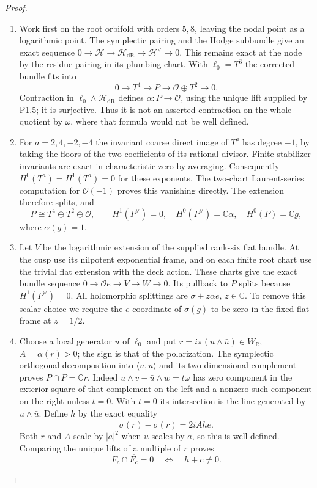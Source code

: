 \documentclass[11pt,a4paper]{article}
\theoremstyle{definition}
\begin{document}
\begin{proof}
\begin{enumerate}[label=\arabic*.]
\item Work first on the root orbifold with orders $5,8$, leaving the nodal
point as a logarithmic point.  The symplectic pairing and the Hodge
subbundle give an exact sequence
$0\to\mathcal H\to\mathcal H_{\mathrm{dR}}\to\mathcal H^\vee\to0$.
This remains exact at the node by the residue pairing in its plumbing
chart.  With $\ell_0=T^3$ the corrected bundle fits into
\[
0\longrightarrow T^4\longrightarrow P
 \longrightarrow\mathcal O\oplus T^2\longrightarrow0.
\]
Contraction in $\ell_0\wedge\mathcal H_{\mathrm{dR}}$ defines
$\alpha:P\to\mathcal O$, using the unique lift supplied by P1.5;
it is surjective.  Thus it is not an asserted contraction on the whole
quotient by $\omega$, where that formula would not be well defined.

\item For $a=2,4,-2,-4$ the invariant coarse direct image of $T^a$ has degree
$-1$, by taking the floors of the two coefficients of its rational
divisor.  Finite-stabilizer invariants are exact in characteristic zero
by averaging.  Consequently $H^0(T^a)=H^1(T^a)=0$ for these exponents.
The two-chart Laurent-series computation for $\mathcal O(-1)$ proves
this vanishing directly.  The extension therefore splits, and
\[
P\cong T^4\oplus T^2\oplus\mathcal O,\qquad
H^1(P^\vee)=0,\quad H^0(P^\vee)=\mathbb C\alpha,
\quad H^0(P)=\mathbb Cg,
\]
where $\alpha(g)=1$.

\item Let $V$ be the logarithmic extension of the supplied rank-six flat
bundle.  At the cusp use its nilpotent exponential frame, and on each
finite root chart use the trivial flat extension with the deck action.
These charts give the exact bundle sequence
$0\to\mathcal Oe\to V\to W\to0$.
Its pullback to $P$ splits because $H^1(P^\vee)=0$.
All holomorphic splittings are $\sigma+z\alpha e$, $z\in\mathbb C$.
To remove this scalar choice we require the $e$-coordinate of
$\sigma(g)$ to be zero in the fixed flat frame at $z=1/2$.

\item Choose a local generator $u$ of $\ell_0$ and put
$r=i\pi(u\wedge\bar u)\in W_{\mathbb R}$, $A=\alpha(r)>0$;
the sign is that of the polarization.  The symplectic orthogonal
decomposition into $\langle u,\bar u\rangle$ and its two-dimensional
complement proves $P\cap\bar P=\mathbb Cr$.
Indeed $u\wedge v-\bar u\wedge w=t\omega$ has zero component in the
exterior square of that complement on the left and a nonzero such
component on the right unless $t=0$.  With $t=0$ its intersection is
the line generated by $u\wedge\bar u$.
Define $h$ by the exact equality
\[
\sigma(r)-\overline{\sigma(r)}=2iAh e.
\]
Both $r$ and $A$ scale by $|a|^2$ when $u$ scales by $a$, so this is
well defined.  Comparing the unique lifts of a multiple of $r$ proves
\[
F_c\cap\overline{F_c}=0\quad\Longleftrightarrow\quad h+c\ne0.
\]


\end{enumerate}
\end{proof}
\end{document}
